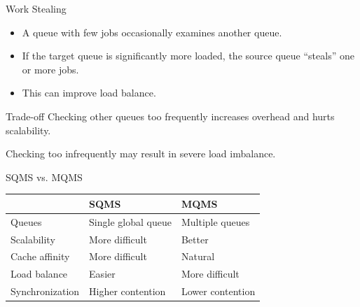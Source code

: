 \begin{frame}{Work Stealing}

\begin{itemize}
    \item A queue with few jobs occasionally examines another queue.

    \item If the target queue is significantly more loaded, the source
    queue ``steals'' one or more jobs.

    \item This can improve load balance.
\end{itemize}

\vspace{0.3cm}

\begin{alertblock}{Trade-off}
Checking other queues too frequently increases overhead and hurts
scalability.

Checking too infrequently may result in severe load imbalance.
\end{alertblock}

\end{frame}

\begin{frame}{SQMS vs. MQMS}

\begin{center}
\begin{tabular}{lll}
\hline
 & \textbf{SQMS} & \textbf{MQMS} \\
\hline
Queues
    & Single global queue
    & Multiple queues \\

Scalability
    & More difficult
    & Better \\

Cache affinity
    & More difficult
    & Natural \\

Load balance
    & Easier
    & More difficult \\

Synchronization
    & Higher contention
    & Lower contention \\
\hline
\end{tabular}
\end{center}

\end{frame}

